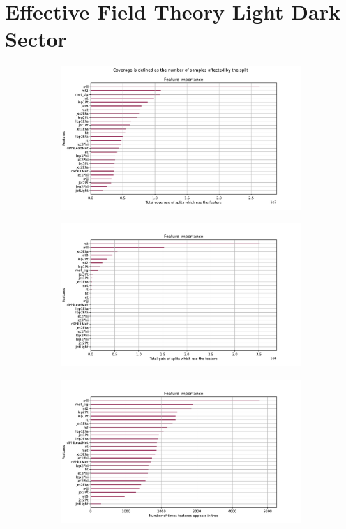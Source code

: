 \documentclass[12pt, a4paper]{book}
\begin{document}
\section{Effective Field Theory Light Dark Sector}
\begin{figure}[!ht]
	\centering
	\begin{subfigure}[b]{0.7\textwidth}
      \centering
      \includegraphics[width=1\textwidth]{XGBoost/EFT_LDS/feature_importance/total_cover.pdf}
      \end{subfigure}
      \hfill
      \begin{subfigure}[b]{0.7\textwidth}
         \centering
         \includegraphics[width=1\textwidth]{XGBoost/EFT_LDS/feature_importance/total_gain.pdf}
      \end{subfigure}
      \hfill
      \begin{subfigure}[b]{0.7\textwidth}
         \centering
         \includegraphics[width=1\textwidth]{XGBoost/EFT_LDS/feature_importance/weight.pdf}

\end{subfigure}
\end{figure}
\end{document}

